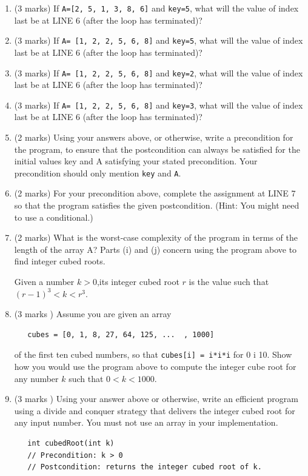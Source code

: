 \documentclass[twoside=false,DIV=14]{scrartcl}
\begin{document}
\begin{enumerate}
\item (3 marks) If \verb+A=[2, 5, 1, 3, 8, 6]+ and \verb+key=5+, what will the value of index last be at LINE 6 (after the loop has terminated)?
\item (3 marks) If \verb+A= [1, 2, 2, 5, 6, 8]+ and \verb+key=5+, what will the value of index last be at LINE 6 (after the loop has terminated)?
\item (3 marks) If \verb+A= [1, 2, 2, 5, 6, 8]+ and \verb+key=2+, what will the value of index last be at LINE 6 (after the loop has terminated)?
\item (3 marks) If \verb+A= [1, 2, 2, 5, 6, 8]+ and \verb+key=3+, what will the value of index last be at LINE 6 (after the loop has terminated)?
\item (2 marks) Using your answers above, or otherwise, write a precondition for the program, to ensure that the postcondition can always be satisfied for the initial values key and A satisfying your stated precondition. Your precondition should only mention \verb+key+ and \verb+A+.
\item (2 marks) For your precondition above, complete the assignment at LINE 7 so that the program satisfies the given postcondition. (Hint: You might need to use a conditional.)
\item (2 marks) What is the worst-case complexity of the program in terms of the length of the array A?
Parts (i) and (j) concern using the program above to find integer cubed roots. 

Given a number $k>0$,its integer cubed root $r$ is the value such that $(r-1)^3 < k < r^3$.
\item (3 marks ) Assume you are given an array
\begin{lstlisting}
   cubes = [0, 1, 8, 27, 64, 125, ...  , 1000]
\end{lstlisting}
of the first ten cubed numbers, so that \verb+cubes[i] = i*i*i+ for 0  i  10. Show how you would use the program above to compute the integer cube root for any number $k$ such that $0 < k < 1000$.
\item (3 marks ) Using your answer above or otherwise, write an efficient program using a divide and conquer strategy that delivers the integer cubed root for any input number. You must not use an array in your implementation.
\begin{lstlisting}
   int cubedRoot(int k)
   // Precondition: k > 0
   // Postcondition: returns the integer cubed root of k.
\end{lstlisting}
\end{enumerate}
\end{document}
